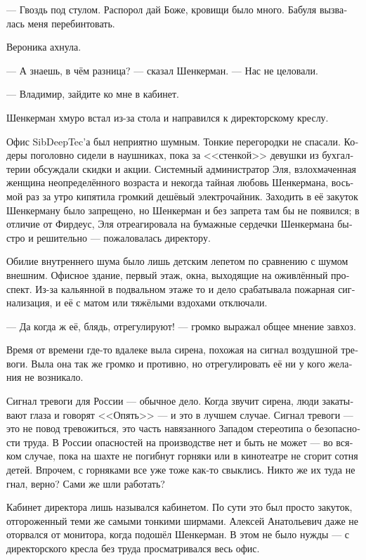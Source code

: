 \documentclass[a5paper,12pt,fleqn]{extbook}\usepackage{cooltooltips}\usepackage{polyglossia}\setdefaultlanguage[babelshorthands=true]{russian}\setotherlanguage{english}\defaultfontfeatures{Ligatures=TeX,Mapping=tex-text} \usepackage{xcolor}\definecolor{lightgray}{HTML}{bbbbbb}\color{lightgray}\newcommand{\ml}[3]{\textenglish{\textcolor{black}{#3}}}
\newcommand{\asterism}{\vspace{1em}{\centering\Large\bfseries$\ast~\ast~\ast$\par}\vspace{1em}}
\begin{document}
--- Гвоздь под стулом.
Распорол дай Боже, кровищи было много.
Бабуля вызвалась меня перебинтовать.

Вероника ахнула.

--- А знаешь, в чём разница? --- сказал Шенкерман.
--- Нас не целовали.

\asterism

--- Владимир, зайдите ко мне в кабинет.

Шенкерман хмуро встал из-за стола и направился к директорскому креслу.

Офис SibDeepTec'а был неприятно шумным.
Тонкие перегородки не спасали.
Кодеры поголовно сидели в наушниках, пока за <<стенкой>> девушки из бухгалтерии обсуждали скидки и акции.
Системный администратор Эля, взлохмаченная женщина неопределённого возраста и некогда тайная любовь Шенкермана, восьмой раз за утро кипятила громкий дешёвый электрочайник.
Заходить в её закуток Шенкерману было запрещено, но Шенкерман и без запрета там бы не появился;
в отличие от Фирдеус, Эля отреагировала на бумажные сердечки Шенкермана быстро и решительно --- пожаловалась директору.

Обилие внутреннего шума было лишь детским лепетом по сравнению с шумом внешним.
Офисное здание, первый этаж, окна, выходящие на оживлённый проспект.
Из-за кальянной в подвальном этаже то и дело срабатывала пожарная сигнализация, и её с матом или тяжёлыми вздохами отключали.

--- Да когда ж её, блядь, отрегулируют! --- громко выражал общее мнение завхоз.

Время от времени где-то вдалеке выла сирена, похожая на сигнал воздушной тревоги.
Выла она так же громко и противно, но отрегулировать её ни у кого желания не возникало.

Сигнал тревоги для России --- обычное дело.
Когда звучит сирена, люди закатывают глаза и говорят <<Опять>> --- и это в лучшем случае.
Сигнал тревоги --- это не повод тревожиться, это часть навязанного Западом стереотипа о безопасности труда.
В России опасностей на производстве нет и быть не может --- во всяком случае, пока на шахте не погибнут горняки или в кинотеатре не сгорит сотня детей.
Впрочем, с горняками все уже тоже как-то свыклись.
Никто же их туда не гнал, верно?
Сами же шли работать?

Кабинет директора лишь назывался кабинетом.
По сути это был просто закуток, отгороженный теми же самыми тонкими ширмами.
Алексей Анатольевич даже не оторвался от монитора, когда подошёл Шенкерман.
В этом не было нужды --- с директорского кресла без труда просматривался весь офис.
\end{document}

